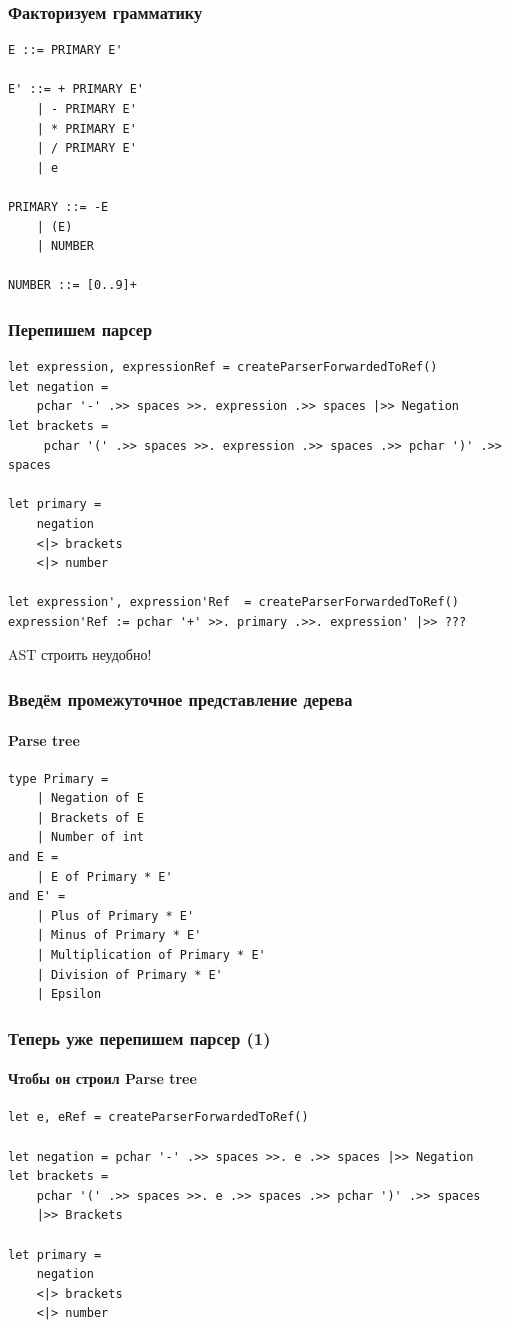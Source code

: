 \documentclass[xetex,mathserif,serif]{beamer}
\begin{document}
    \begin{frame}[fragile]
        \frametitle{Факторизуем грамматику}
        \begin{verbatim}
E ::= PRIMARY E'

E' ::= + PRIMARY E'
    | - PRIMARY E'
    | * PRIMARY E'
    | / PRIMARY E'
    | e

PRIMARY ::= -E
    | (E)
    | NUMBER

NUMBER ::= [0..9]+
        \end{verbatim}
    \end{frame}

    \begin{frame}[fragile]
        \frametitle{Перепишем парсер}
        \begin{verbatim}
let expression, expressionRef = createParserForwardedToRef()
let negation = 
    pchar '-' .>> spaces >>. expression .>> spaces |>> Negation
let brackets =
     pchar '(' .>> spaces >>. expression .>> spaces .>> pchar ')' .>> spaces 

let primary = 
    negation
    <|> brackets
    <|> number

let expression', expression'Ref  = createParserForwardedToRef()
expression'Ref := pchar '+' >>. primary .>>. expression' |>> ???
        \end{verbatim}
        AST строить неудобно!
    \end{frame}

    \begin{frame}[fragile]
        \frametitle{Введём промежуточное представление дерева}
        \framesubtitle{Parse tree}
        \begin{verbatim}
type Primary =
    | Negation of E
    | Brackets of E
    | Number of int
and E = 
    | E of Primary * E'
and E' =
    | Plus of Primary * E'
    | Minus of Primary * E'
    | Multiplication of Primary * E'
    | Division of Primary * E'
    | Epsilon
        \end{verbatim}
    \end{frame}

    \begin{frame}[fragile]
        \frametitle{Теперь уже перепишем парсер (1)}
        \framesubtitle{Чтобы он строил Parse tree}
        \begin{verbatim}
let e, eRef = createParserForwardedToRef()

let negation = pchar '-' .>> spaces >>. e .>> spaces |>> Negation
let brackets = 
    pchar '(' .>> spaces >>. e .>> spaces .>> pchar ')' .>> spaces
    |>> Brackets

let primary = 
    negation
    <|> brackets
    <|> number

        \end{verbatim}
    \end{frame}
\end{document}
